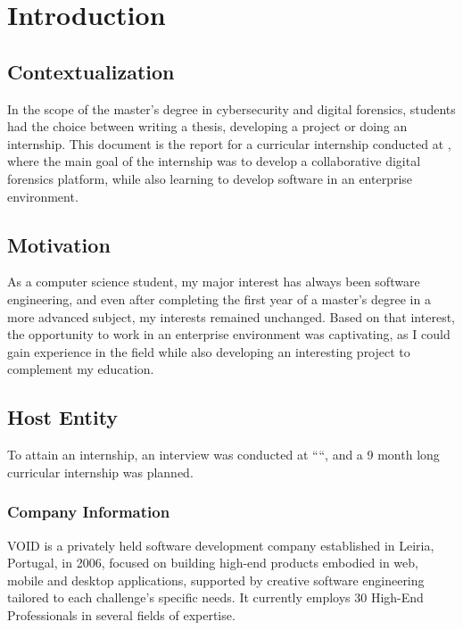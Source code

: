 
\chapter{Introduction}
\label{ch:introduction}



\section{Contextualization}

In the scope of the master's degree in cybersecurity and digital forensics, students had the choice between writing a thesis, developing a project or doing an internship.
This document is the report for a curricular internship conducted at \company, where the main goal of the internship was to develop a collaborative digital forensics platform,
while also learning to develop software in an enterprise environment.

\section{Motivation}

As a computer science student, my major interest has always been software engineering, and even after completing the first year of a master's degree in a more advanced subject, 
my interests remained unchanged. Based on that interest, the opportunity to work in an enterprise environment was captivating, as I could gain experience in the 
field while also developing an interesting project to complement my education.

\section{Host Entity}

To attain an internship, an interview was conducted at ``\company``, and a 9 month long curricular internship was planned.

\subsection{Company Information}

VOID is a privately held software development company established in Leiria, Portugal, in 2006, focused on building high-end products embodied in web, 
mobile and desktop applications, supported by creative software engineering tailored to each challenge's specific needs. 
It currently employs 30 High-End Professionals in several fields of expertise.

